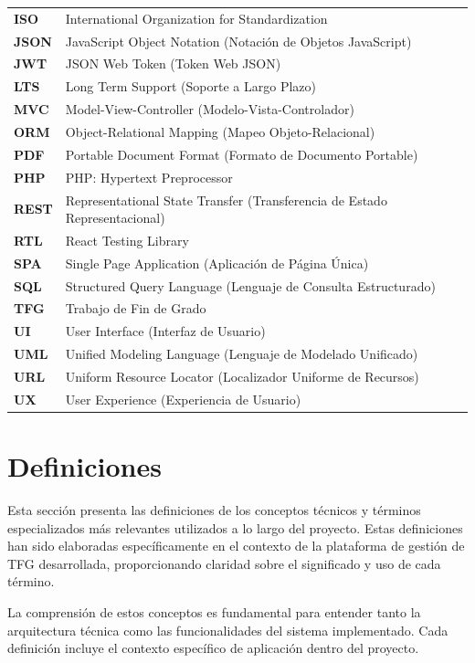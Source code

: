 \documentclass[12pt,a4paper,oneside]{report}
\begin{document}
\begin{longtable}[]{@{}
  >{\raggedright\arraybackslash}p{}
  >{\raggedright\arraybackslash}p{}@{}}
\textbf{ISO} & International Organization for Standardization \\
\textbf{JSON} & JavaScript Object Notation (Notación de Objetos
JavaScript) \\
\textbf{JWT} & JSON Web Token (Token Web JSON) \\
\textbf{LTS} & Long Term Support (Soporte a Largo Plazo) \\
\textbf{MVC} & Model-View-Controller (Modelo-Vista-Controlador) \\
\textbf{ORM} & Object-Relational Mapping (Mapeo Objeto-Relacional) \\
\textbf{PDF} & Portable Document Format (Formato de Documento
Portable) \\
\textbf{PHP} & PHP: Hypertext Preprocessor \\
\textbf{REST} & Representational State Transfer (Transferencia de Estado
Representacional) \\
\textbf{RTL} & React Testing Library \\
\textbf{SPA} & Single Page Application (Aplicación de Página Única) \\
\textbf{SQL} & Structured Query Language (Lenguaje de Consulta
Estructurado) \\
\textbf{TFG} & Trabajo de Fin de Grado \\
\textbf{UI} & User Interface (Interfaz de Usuario) \\
\textbf{UML} & Unified Modeling Language (Lenguaje de Modelado
Unificado) \\
\textbf{URL} & Uniform Resource Locator (Localizador Uniforme de
Recursos) \\
\textbf{UX} & User Experience (Experiencia de Usuario) \\
\end{longtable}

\section{Definiciones}\label{definiciones}

Esta sección presenta las definiciones de los conceptos técnicos y
términos especializados más relevantes utilizados a lo largo del
proyecto. Estas definiciones han sido elaboradas específicamente en el
contexto de la plataforma de gestión de TFG desarrollada, proporcionando
claridad sobre el significado y uso de cada término.

La comprensión de estos conceptos es fundamental para entender tanto la
arquitectura técnica como las funcionalidades del sistema implementado.
Cada definición incluye el contexto específico de aplicación dentro del
proyecto.
\end{document}
